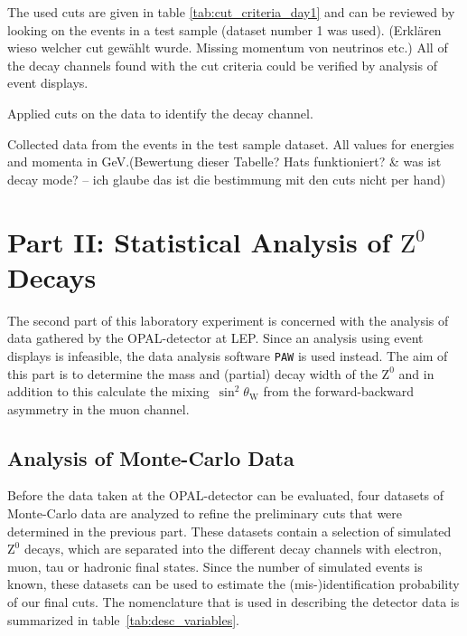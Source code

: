 \documentclass[11pt, a4paper]{article}
\numberwithin{equation}{section}
\newcommand{\korr}[1]{{\color{red}(#1)}}
\begin{document}
The used cuts are given in table \ref{tab:cut_criteria_day1} and can be reviewed by looking on the events in a test sample (dataset number 1 was used). \korr{Erklären wieso welcher cut gewählt wurde. Missing momentum von neutrinos etc.}
All of the decay channels found with the cut criteria could be verified by analysis of event displays.
\begin{table}[htb]
	\centering
	
	\caption{Applied cuts on the data to identify the decay channel.}
	\label{tab:cut_criteria_day1}
\end{table}
\begin{table}
	\centering
		
	\caption{Collected data from the events in the test sample dataset. All values for energies and momenta in \si{GeV}.\korr{Bewertung dieser Tabelle? Hats funktioniert? \& was ist decay mode? -- ich glaube das ist die bestimmung mit den cuts nicht per hand}}
\end{table}

\clearpage
\section{Part II: Statistical Analysis of $\mathrm{Z}^0$ Decays}
The second part of this laboratory experiment is concerned with the analysis of data gathered by the OPAL-detector at LEP.
Since an analysis using event displays is infeasible, the data analysis software \texttt{PAW} is used instead.
The aim of this part is to determine the mass and (partial) decay width of the $\mathrm{Z}^0$ and in addition to this calculate the mixing~$\sin^2\theta_\mathrm{W}$ from the forward-backward asymmetry in the muon channel.

\subsection{Analysis of Monte-Carlo Data}
\label{sec:analysis_mc_data}
Before the data taken at the OPAL-detector can be evaluated, four datasets of Monte-Carlo data are analyzed to refine the preliminary cuts that were determined in the previous part.
These datasets contain a selection of simulated $\mathrm{Z}^0$ decays, which are separated into the different decay channels with electron, muon, tau or hadronic final states.
Since the number of simulated events is known, these datasets can be used to estimate the (mis-)identification probability of our final cuts.
The nomenclature that is used in describing the detector data is summarized in table~\ref{tab:desc_variables}.
\end{document}
